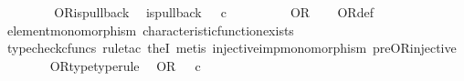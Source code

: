 \begin{isabellebody}
\ \ \ \ \isamarkupfalse%
\isanewline
\ \ \isamarkupfalse%
\isanewline
{}\isamarkupfalse%
%
\endisatagproof
{\isafoldproof}%
%
\isadelimproof
\isanewline
%
\endisadelimproof
\isanewline
{}\isamarkupfalse%
\ OR{\isacharunderscore}{\kern0pt}is{\isacharunderscore}{\kern0pt}pullback{\isacharcolon}{\kern0pt}\isanewline
\ \ {\isachardoublequoteopen}is{\isacharunderscore}{\kern0pt}pullback\ {\isacharparenleft}{\kern0pt}{\isasymone}{\isasymCoprod}{\isacharparenleft}{\kern0pt}{\isasymone}{\isasymCoprod}{\isasymone}{\isacharparenright}{\kern0pt}{\isacharparenright}{\kern0pt}\ {\isasymone}\ {\isacharparenleft}{\kern0pt}{\isasymOmega}{\isasymtimes}\isactrlsub c{\isasymOmega}{\isacharparenright}{\kern0pt}\ {\isasymOmega}\ {\isacharparenleft}{\kern0pt}{\isasymbeta}\isactrlbsub {\isacharparenleft}{\kern0pt}{\isasymone}{\isasymCoprod}{\isacharparenleft}{\kern0pt}{\isasymone}{\isasymCoprod}{\isasymone}{\isacharparenright}{\kern0pt}{\isacharparenright}{\kern0pt}\isactrlesub {\isacharparenright}{\kern0pt}\ {\isasymt}\ {\isacharparenleft}{\kern0pt}{\isasymlangle}{\isasymt}{\isacharcomma}{\kern0pt}\ {\isasymt}{\isasymrangle}{\isasymamalg}\ {\isacharparenleft}{\kern0pt}{\isasymlangle}{\isasymt}{\isacharcomma}{\kern0pt}\ {\isasymf}{\isasymrangle}\ {\isasymamalg}{\isasymlangle}{\isasymf}{\isacharcomma}{\kern0pt}\ {\isasymt}{\isasymrangle}{\isacharparenright}{\kern0pt}{\isacharparenright}{\kern0pt}\ OR{\isachardoublequoteclose}\isanewline
%
\isadelimproof
\ \ %
\endisadelimproof
%
\isatagproof
{}\isamarkupfalse%
\ OR{\isacharunderscore}{\kern0pt}def\isanewline
\ \ \isamarkupfalse%
\ element{\isacharunderscore}{\kern0pt}monomorphism\ characteristic{\isacharunderscore}{\kern0pt}function{\isacharunderscore}{\kern0pt}exists\isanewline
\ \ \isamarkupfalse%
\ {\isacharparenleft}{\kern0pt}typecheck{\isacharunderscore}{\kern0pt}cfuncs{\isacharcomma}{\kern0pt}\ rule{\isacharunderscore}{\kern0pt}tac\ the{}I{}{\isacharcomma}{\kern0pt}\ metis\ injective{\isacharunderscore}{\kern0pt}imp{\isacharunderscore}{\kern0pt}monomorphism\ pre{\isacharunderscore}{\kern0pt}OR{\isacharunderscore}{\kern0pt}injective{\isacharparenright}{\kern0pt}%
\endisatagproof
{\isafoldproof}%
%
\isadelimproof
\isanewline
%
\endisadelimproof
\ \ \ \ \ \ \isanewline
{}\isamarkupfalse%
\ OR{\isacharunderscore}{\kern0pt}type{\isacharbrackleft}{\kern0pt}type{\isacharunderscore}{\kern0pt}rule{\isacharbrackright}{\kern0pt}{\isacharcolon}{\kern0pt}\isanewline
\ \ {\isachardoublequoteopen}OR\ {\isacharcolon}{\kern0pt}\ {\isasymOmega}\ {\isasymtimes}\isactrlsub c\ {\isasymOmega}\ {\isasymrightarrow}\ {\isasymOmega}{\isachardoublequoteclose}\isanewline

\end{isabellebody}
